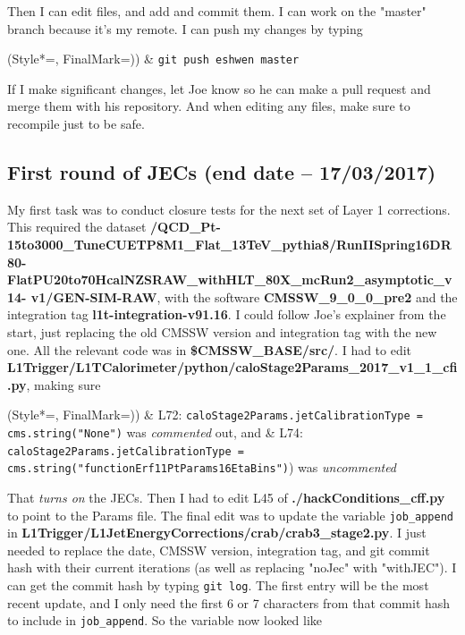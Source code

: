 Then I can edit files, and add and commit them. I can work on the "master" branch because it's my remote. I can push my changes by typing

\begin{easylist}
\ListProperties(Style*=, FinalMark={)})
& \texttt{git push eshwen master}
\end{easylist}

If I make significant changes, let Joe know so he can make a pull request and merge them with his repository. And when editing any files, make sure to recompile just to be safe.

\subsection{First round of JECs (end date -- 17/03/2017)}

My first task was to conduct closure tests for the next set of Layer 1 corrections. This required the dataset \textbf{/QCD\_Pt-15to3000\_TuneCUETP8M1\_Flat\_13TeV\_pythia8/RunIISpring16DR80-FlatPU20to70HcalNZSRAW\_withHLT\_80X\_mcRun2\_asymptotic\_v14- v1/GEN-SIM-RAW}, with the software \textbf{CMSSW\_9\_0\_0\_pre2} and the integration tag \textbf{l1t-integration-v91.16}. I could follow Joe's explainer from the start, just replacing the old CMSSW version and integration tag with the new one. All the relevant code was in \textbf{\$CMSSW\_BASE/src/}. I had to edit \textbf{L1Trigger/L1TCalorimeter/python/caloStage2Params\_2017\_v1\_1\_cfi.py}, making sure

\begin{easylist}
\ListProperties(Style*=, FinalMark={)})
& L72: \texttt{caloStage2Params.jetCalibrationType = cms.string("None")} was \emph{commented} out, and
& L74: \texttt{caloStage2Params.jetCalibrationType = cms.string("functionErf11PtParams16EtaBins")}) was \emph{uncommented}
\end{easylist}

That \emph{turns on} the JECs. Then I had to edit L45 of \textbf{./hackConditions\_cff.py} to point to the Params file. The final edit was to update the variable \texttt{job\_append} in \textbf{L1Trigger/L1JetEnergyCorrections/crab/crab3\_stage2.py}. I just needed to replace the date, CMSSW version, integration tag, and git commit hash with their current iterations (as well as replacing "noJec" with "withJEC"). I can get the commit hash by typing \texttt{git log}. The first entry will be the most recent update, and I only need the first 6 or 7 characters from that commit hash to include in \texttt{job\_append}. So the variable now looked like

